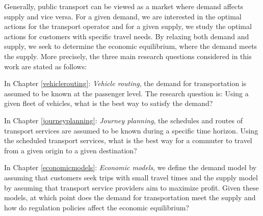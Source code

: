 \documentclass[dissertation,draft*]{aaltoseries}
\begin{document}
Generally, public transport can be viewed as a market where demand affects supply and vice versa.
For a given demand, we are interested in the optimal actions for the transport operator and for a given supply, 
we study the optimal actions for customers with specific travel needs. By relaxing both demand and supply, 
we seek to determine the economic equilibrium, where the demand meets the supply.
More precisely, the three main research questions considered in this work are stated as follows: 

In Chapter \ref{vehiclerouting}: \emph{Vehicle routing}, the demand for transportation is assumed to be known at the passenger level. 
The research question is: Using a given fleet of vehicles, what is the best way to satisfy the demand? 

In Chapter \ref{journeyplanning}: \emph{Journey planning}, the schedules and routes of transport services are assumed to be known during a specific time horizon.
Using the scheduled transport services, what is the best way for a commuter to travel from a given origin to a given destination?

In Chapter \ref{economicmodels}: \emph{Economic models}, we define the demand model by assuming that customers seek trips with
small travel times and the supply model by assuming that transport service providers aim to maximize profit. Given these models,
at which point does the demand for transportation meet the supply and how do regulation policies affect the economic equilibrium?


\end{document}
